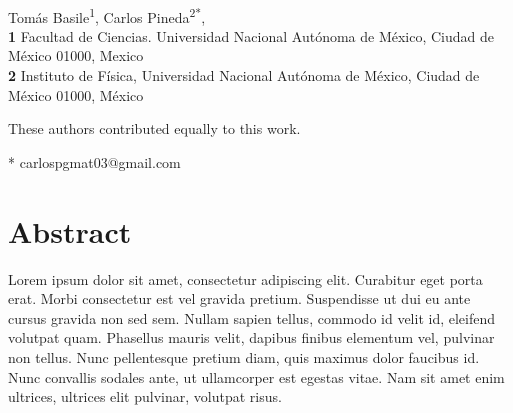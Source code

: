 \documentclass[10pt,letterpaper]{article}
\begin{document}
\vspace*{0.2in}



\begin{flushleft}
{\Large
\textbf{} %
}
\newline
\\
Tomás Basile\textsuperscript{1\Yinyang},
Carlos Pineda\textsuperscript{2*\Yinyang},
\\
\bigskip
\textbf{1} Facultad de Ciencias. Universidad Nacional Autónoma de México, Ciudad de México 01000, Mexico
\\
\textbf{2} Instituto de Física, Universidad Nacional Autónoma de México, Ciudad de México 01000, México
\\
\bigskip

% 
%
\Yinyang These authors contributed equally to this work.





* carlospgmat03@gmail.com

\end{flushleft}
\section*{Abstract}
Lorem ipsum dolor sit amet, consectetur adipiscing elit. Curabitur eget porta erat. Morbi consectetur est vel gravida pretium. Suspendisse ut dui eu ante cursus gravida non sed sem. Nullam sapien tellus, commodo id velit id, eleifend volutpat quam. Phasellus mauris velit, dapibus finibus elementum vel, pulvinar non tellus. Nunc pellentesque pretium diam, quis maximus dolor faucibus id. Nunc convallis sodales ante, ut ullamcorper est egestas vitae. Nam sit amet enim ultrices, ultrices elit pulvinar, volutpat risus.
\end{document}
